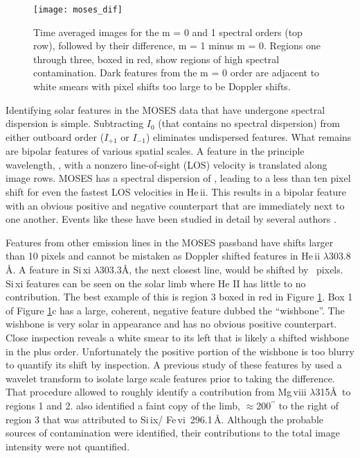 		\begin{figure}
			\centering
			\texttt{[image: moses\_dif]}
			\caption{Time averaged images for the m = 0 and 1 spectral orders (top row), followed by their difference, m = 1 minus m = 0.  Regions one through three, boxed in red, show regions of high spectral contamination. Dark features from the m = 0 order are adjacent to white smears with pixel shifts too large to be Doppler shifts.}
			\label{fig:moses_super}
		\end{figure}
	
		
		Identifying solar features in the MOSES data that have undergone spectral dispersion is simple. 
		Subtracting $I_0$ (that contains no spectral dispersion) from either outboard order ($I_{+1}$ or $I_{-1}$) eliminates undispersed features. 
		What remains are bipolar features of various spatial scales.  
		A feature in the principle wavelength, \heii, with a nonzero line-of-sight (LOS) velocity is translated along image rows.    
		MOSES has a spectral dispersion of \spectdispersvel, leading to a less than ten pixel shift for even the fastest LOS velocities in He\,{\sc ii}. 
		This results in a bipolar feature with an obvious positive and negative counterpart that are immediately next to one another. Events like these have been studied in detail by several authors \citep{Fox2011,Courrier2018,Rust2019}.
		
		
		Features from other emission lines in the MOSES passband have shifts larger than 10 pixels and cannot be mistaken as Doppler shifted features in He\,{\sc ii}  $\lambda303.8$ \AA. 
		A feature in Si\,{\sc xi} $\lambda$303.3\AA, the next closest line, would be shifted by \sixipix\ pixels. 
		Si\,{\sc xi} features can be seen on the solar limb where He II has little to no contribution. 
		The best example of this is region 3 boxed in red in Figure \ref{fig:moses_super}.  
		Box 1 of Figure \ref{fig:moses_super}c has a large, coherent, negative feature dubbed the ``wishbone''.  
		The wishbone is very solar in appearance and has no obvious positive counterpart.  
		Close inspection reveals a white smear to its left that is likely a shifted wishbone in the plus order.  
		Unfortunately the positive portion of the wishbone is too blurry to quantify its shift by inspection. 
		A previous study of these features by \citet{Rust2017} used a wavelet transform to isolate large scale features prior to taking the difference.  
		That procedure allowed \citet{Rust2017} to roughly identify a contribution from Mg\,{\sc viii} $\lambda$315\AA \  to regions 1 and 2.
		\citet{Rust2017} also identified a faint copy of the limb, $\approx$200$^{\prime\prime}$ to the right of region 3 that was attributed to Si\,{\sc ix}/ Fe\,{\sc vi}\ 296.1\,\AA.
		Although the probable sources of contamination were identified, their contributions to the total image intensity were not quantified.
	
